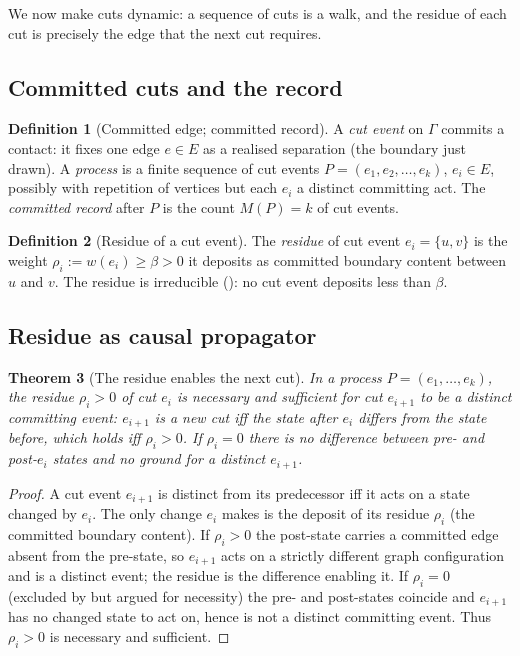 \documentclass[11pt,a4paper]{article}
\theoremstyle{thmstyle}
\newtheorem{theorem}{Theorem}[section]
\theoremstyle{definition}
\newtheorem{definition}[theorem]{Definition}
\theoremstyle{remark}
\newcommand{\Gph}{\Gamma}
\newcommand{\E}{E}
\newcommand{\wt}{w}
\newcommand{\flo}{\beta}                 %
\newcommand{\rec}{M}                     %
\newcommand{\res}{\rho}                  %
\begin{document}
We now make cuts dynamic: a sequence of cuts is a walk, and the residue of
each cut is precisely the edge that the next cut requires.

\subsection{Committed cuts and the record}

\begin{definition}[Committed edge; committed record]
\label{def:committed}
A \emph{cut event} on $\Gph$ commits a contact: it fixes one edge
$e\in\E$ as a realised separation (the boundary just drawn). A
\emph{process} is a finite sequence of cut events
$P=(e_1,e_2,\dots,e_k)$, $e_i\in\E$, possibly with repetition of vertices
but each $e_i$ a distinct committing act. The \emph{committed record}
after $P$ is the count $\rec(P)=k$ of cut events.
\end{definition}

\begin{definition}[Residue of a cut event]
\label{def:residue}
The \emph{residue} of cut event $e_i=\{u,v\}$ is the weight
$\res_i:=\wt(e_i)\ge\flo>0$ it deposits as committed boundary content
between $u$ and $v$. The residue is irreducible (): no cut
event deposits less than $\flo$.
\end{definition}

\subsection{Residue as causal propagator}

\begin{theorem}[The residue enables the next cut]
\label{thm:propagator}
In a process $P=(e_1,\dots,e_k)$, the residue $\res_i>0$ of cut $e_i$ is
necessary and sufficient for cut $e_{i+1}$ to be a distinct committing
event: $e_{i+1}$ is a new cut iff the state after $e_i$ differs from the
state before, which holds iff $\res_i>0$. If $\res_i=0$ there is no
difference between pre- and post-$e_i$ states and no ground for a distinct
$e_{i+1}$.
\end{theorem}

\begin{proof}
A cut event $e_{i+1}$ is distinct from its predecessor iff it acts on a
state changed by $e_i$. The only change $e_i$ makes is the deposit of its
residue $\res_i$ (the committed boundary content). If $\res_i>0$ the
post-state carries a committed edge absent from the pre-state, so
$e_{i+1}$ acts on a strictly different graph configuration and is a
distinct event; the residue is the difference enabling it. If $\res_i=0$
(excluded by  but argued for necessity) the pre- and
post-states coincide and $e_{i+1}$ has no changed state to act on, hence is
not a distinct committing event. Thus $\res_i>0$ is necessary and
sufficient.
\end{proof}
\end{document}
